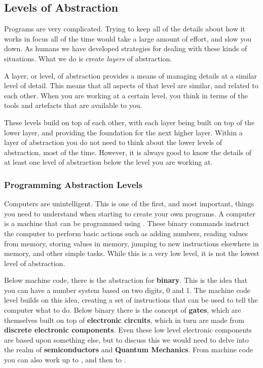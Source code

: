 \subsection{Levels of Abstraction} %
\label{sub:levels_of_abstraction}

Programs are very complicated. Trying to keep all of the details about how it works in focus all of the time would take a large amount of effort, and slow you down. As humans we have developed strategies for dealing with these kinds of situations. What we do is create \emph{layers} of abstraction.

A layer, or level, of abstraction provides a means of managing details at a similar level of detail. This means that all aspects of that level are similar, and related to each other. When you are working at a certain level, you think in terms of the tools and artefacts that are available to you. 

These levels build on top of each other, with each layer being built on top of the lower layer, and providing the foundation for the next higher layer. Within a layer of abstraction you do not need to think about the lower levels of abstraction, most of the time. However, it is always good to know the details of at least one level of abstraction below the level you are working at.

\subsubsection{Programming Abstraction Levels} %
\label{ssub:programming_abstraction_levels}

Computers are unintelligent. This is one of the first, and most important, things you need to understand when starting to create your own programs. A computer is a machine that can be programmed using . These binary commands instruct the computer to perform basic actions such as adding numbers, reading values from memory, storing values in memory, jumping to new instructions elsewhere in memory, and other simple tasks. While this is a very low level, it is not the lowest level of abstraction.

Below machine code, there is the abstraction for \textbf{binary}. This is the idea that you can have a number system based on two digits, 0 and 1. The machine code level builds on this idea, creating a set of instructions that can be used to tell the computer what to do. Below binary there is the concept of \textbf{gates}, which are themselves built on top of \textbf{electronic circuits}, which in turn are made from \textbf{discrete electronic components}. Even these low level electronic components are based upon something else, but to discuss this we would need to delve into the realm of \textbf{semiconductors} and \textbf{Quantum Mechanics}. From machine code you can also work up to , and then to .

